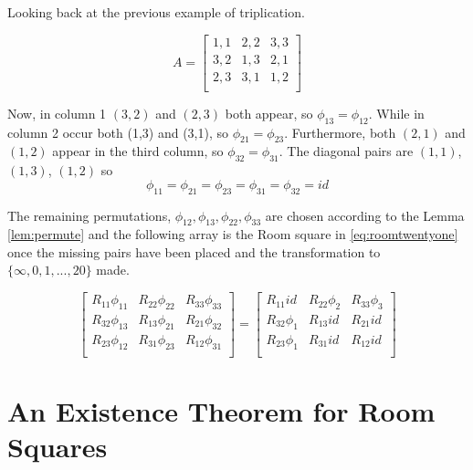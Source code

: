 \documentclass[11pt, a4paper]{book}\usepackage[]{graphicx}\usepackage[]{xcolor}
\newcounter{example}
\begin{document}
\begin{example}
Looking back at the previous example of triplication.

\begin{equation}
 A = \begin{bmatrix}
  1,1 & 2,2 & 3,3 \\
  3,2 & 1,3 & 2,1 \\
  2,3 & 3,1 & 1,2 \\
 \end{bmatrix}
\end{equation}

Now, in column 1 $(3, 2)$ and $(2, 3)$ both appear, so
$\phi _{13} = \phi _{12}$.
While in column 2 occur both (1,3) and
(3,1), so $\phi _{21} = \phi _{23}$.
Furthermore, both $(2, 1)$ and $(1, 2)$ appear in the third
column, so $\phi _{32} = \phi _{31}$.
The diagonal pairs are $(1, 1)$, $(1, 3)$, $(1, 2)$ so
\begin{equation}
\phi _{11} = \phi _{21} = \phi _{23} = \phi _{31} = \phi _{32} = id
\end{equation}

The remaining permutations,
$\phi _{12}, \phi _{13}, \phi _{22}, \phi _{33}$ are chosen
according to the Lemma \ref{lem:permute}
and the following array is the Room square in \ref{eq:roomtwentyone} once
the missing pairs have been placed and the transformation to
$\{\infty, 0, 1, ..., 20\}$ made.

\begin{equation}
  \begin{bmatrix}
   R_{11}\phi_{11} & R_{22}\phi_{22} & R_{33}\phi_{33} \\
   R_{32}\phi_{13} & R_{13}\phi_{21} & R_{21}\phi_{32} \\
   R_{23}\phi_{12} & R_{31}\phi_{23} & R_{12}\phi_{31} \\
  \end{bmatrix}
  =
  \begin{bmatrix}
      R_{11}id    & R_{22}\phi_{2} & R_{33}\phi_{3} \\
   R_{32}\phi_{1} &   R_{13}id     &    R_{21}id    \\
   R_{23}\phi_{1} &   R_{31}id     &    R_{12}id    \\
  \end{bmatrix}
\end{equation}

\end{example}
    

\chapter{An Existence Theorem for Room Squares}
\end{document}
